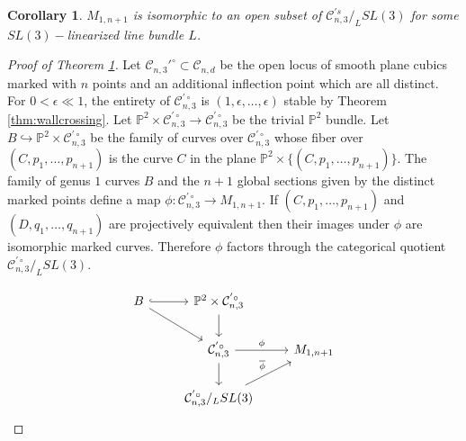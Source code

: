 \documentclass{amsart}
\newcommand{\Pj}{\mathbb{P}}
\newcommand{\mc}{\mathcal}
\numberwithin{equation}{section}
\newtheorem{cor}[prop]{Corollary}
\theoremstyle{definition}
\begin{document}
\begin{cor}\label{thm:M_1n}
    $M_{1,n+1}$ is isomorphic to an open subset of $\mc{C}_{n,3}^{'s} \slash_L SL(3)$ for some $SL(3)-$linearized line bundle $L$.
\end{cor}

\begin{proof}[Proof of Theorem \ref{thm:M_1n}]
Let $\mc{C}_{n,3}'^{\circ} \subset \mc{C}_{n,d}$ be the open locus of smooth plane cubics marked with $n$ points and an additional inflection point which are all distinct. For $0 < \epsilon \ll 1$, the entirety of $\mc{C}_{n,3}^{' \circ}$ is $(1, \epsilon, \dots , \epsilon)$ stable by Theorem \ref{thm:wallcrossing}. Let $\Pj^2 \times \mc{C}_{n,3}^{' \circ} \rightarrow \mc{C}_{n,3}^{' \circ} $ be the trivial $\Pj^2$ bundle. Let $B \hookrightarrow \Pj^2 \times \mc{C}_{n,3}^{' \circ}$ be the family of curves over $\mc{C}_{n,3}^{' \circ} $ whose fiber over $(C, p_1, \dots, p_{n+1})$ is the curve $C$ in the plane $\Pj^2 \times \{(C, p_1, \dots, p_{n+1})\} $. The family of genus $1$ curves $B$ and the $n+1$ global sections given by the distinct marked points define a map $\phi: \mc{C}_{n,3}^{' \circ} \rightarrow M_{1,n+1} $. If $(C, p_1, \dots, p_{n+1})$ and $(D, q_1, \dots, q_{n+1})$ are projectively equivalent then their images under $\phi$ are isomorphic marked curves. Therefore $\phi$ factors through the categorical quotient $\mc{C}_{n,3}^{' \circ} \slash_L SL(3)$.

$$
\begin{tikzcd}
    B \arrow[r, hook] \arrow[dr] & \Pj^2 \times \mc{C}_{n,3}^{' \circ} \arrow[d] & \\
    & \mc{C}_{n,3}^{' \circ}  \arrow[r, "\phi"] \arrow[d] & M_{1,n+1} \\
    & \mc{C}_{n,3}^{' \circ} \slash_L SL(3) \arrow[ur, "\overline{\phi}"] & 
\end{tikzcd}
$$


\end{proof}
\end{document}
